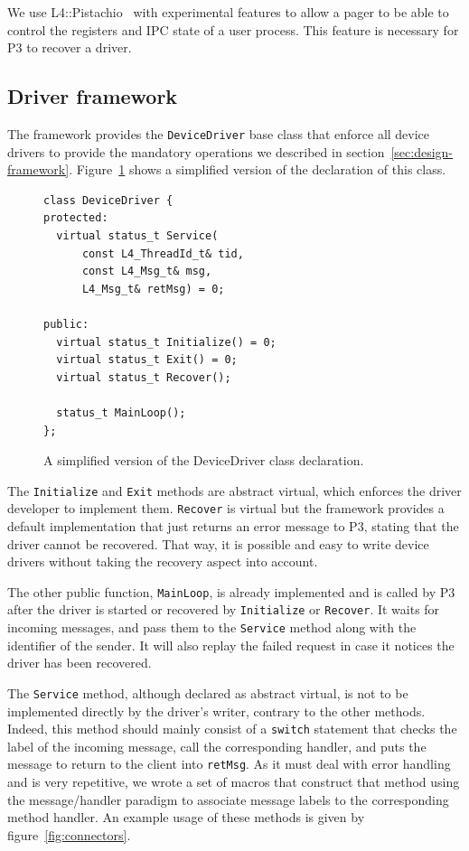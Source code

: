 \documentclass{acm_proc_article-sp}
\begin{document}
We use L4::Pistachio~\cite{L4X2} with experimental features to allow a pager to be able to control the registers and IPC state of a user process.  This feature is necessary for P3 to recover a driver.

\subsection{Driver framework}

The framework provides the \texttt{DeviceDriver} base class that enforce all device drivers to provide the mandatory operations we described in section~\ref{sec:design-framework}. Figure~\ref{fig:devicedriverclass} shows a simplified version of the declaration of this class.

\begin{figure}[ht]
\centering
\begin{screen}
\begin{verbatim}
class DeviceDriver {
protected:
  virtual status_t Service(
      const L4_ThreadId_t& tid,
      const L4_Msg_t& msg,
      L4_Msg_t& retMsg) = 0;

public:
  virtual status_t Initialize() = 0;
  virtual status_t Exit() = 0;
  virtual status_t Recover();

  status_t MainLoop();
};
\end{verbatim}
\end{screen}
\caption{A simplified version of the DeviceDriver class declaration.}
\label{fig:devicedriverclass}
\end{figure}

The \texttt{Initialize} and \texttt{Exit} methods are abstract virtual, which enforces the driver developer to implement them. \texttt{Recover} is virtual but the framework provides a default implementation that just returns an error message to P3, stating that the driver cannot be recovered. That way, it is possible and easy to write device drivers without taking the recovery aspect into account.

The other public function, \texttt{MainLoop}, is already implemented and is called by P3 after the driver is started or recovered by \texttt{Initialize} or \texttt{Recover}. It waits for incoming messages, and pass them to the \texttt{Service} method along with the identifier of the sender. It will also replay the failed request in case it notices the driver has been recovered.

The \texttt{Service} method, although declared as abstract virtual, is not to be implemented directly by the driver's writer, contrary to the other methods. Indeed, this method should mainly consist of a \texttt{switch} statement that checks the label of the incoming message, call the corresponding handler, and puts the message to return to the client into \texttt{retMsg}. As it must deal with error handling and is very repetitive, we wrote a set of macros that construct that method using the message/handler paradigm to associate message labels to the corresponding method handler. An example usage of these methods is given by figure~\ref{fig:connectors}.
\end{document}
